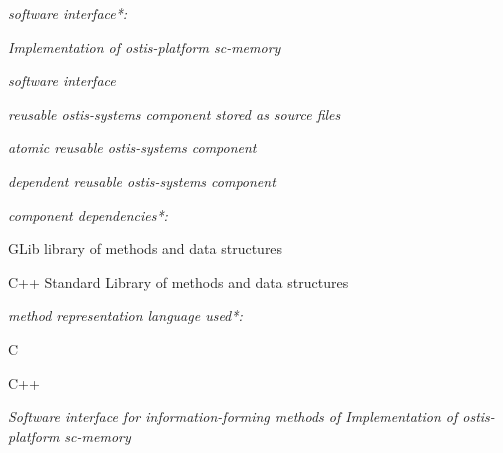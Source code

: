 \documentclass{article}
\begin{document}
\begin{multicols}{2}
\begin{description}[ labelwidth=0.75cm]
\item [$\Leftarrow$] \textit{software interface*:} \par 
\vspace{-0.15cm}
\textit{Implementation of ostis-platform sc-memory}

    \item [$\in$] \textit{software interface}
    
     \item [$\in$] \textit{reusable ostis-systems component stored as
source files}

 \item [$\in$] \textit{atomic reusable ostis-systems component}
 
 \item [$\in$] \textit{dependent reusable ostis-systems component}

 \item [$\Rightarrow$] \textit{component dependencies*:} 

 
 \begin{description}[ labelwidth=0.75cm]
 \vspace{-0.15cm}
 \item[\{•] GLib library of methods and data
structures
  \item[\ •] C++ Standard Library of methods and
data structures
\item[\}]
\end{description} 

\columnbreak

\item [$\Rightarrow$] \textit{method representation language used*:}

 \begin{description}[ labelwidth=0.75cm]
 \vspace{-0.15cm}
 \item[•] C
 \item[•] C++ 

\end{description} 

    \item [\supset] \textit{Software interface for information-forming
methods of Implementation of ostis-platform
sc-memory}


\end{description}
\end{multicols}
\end{document}
